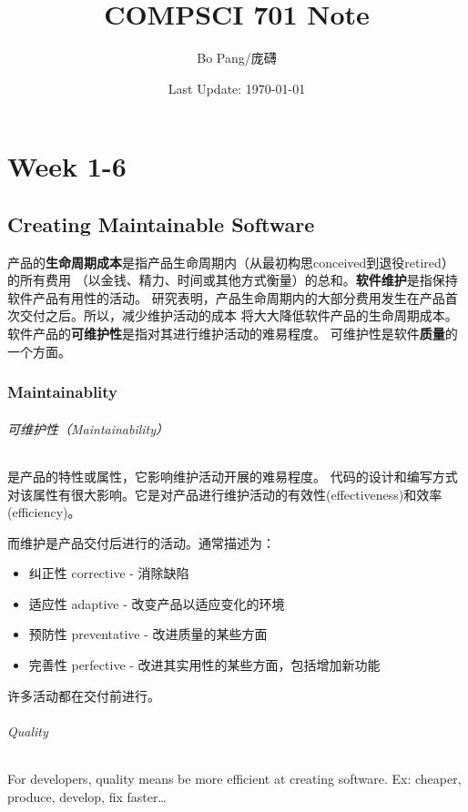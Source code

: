 \documentclass[]{ctexbook}
\title{COMPSCI 701 Note}
\author{Bo Pang/庞礴}
\date{Last Update: \today}
\begin{document}
\maketitle
\tableofcontents

\part{Week 1-6}
\chapter{Creating Maintainable Software}

产品的\textbf{生命周期成本}是指产品生命周期内（从最初构思conceived到退役retired）的所有费用
（以金钱、精力、时间或其他方式衡量）的总和。\textbf{软件维护}是指保持软件产品有用性的活动。
研究表明，产品生命周期内的大部分费用发生在产品首次交付之后。所以，减少维护活动的成本
将大大降低软件产品的生命周期成本。软件产品的\textbf{可维护性}是指对其进行维护活动的难易程度。
可维护性是软件\textbf{质量}的一个方面。

\section{Maintainablity}
\paragraph{可维护性（Maintainability）}是产品的特性或属性，它影响维护活动开展的难易程度。
代码的设计和编写方式对该属性有很大影响。它是对产品进行维护活动的有效性(effectiveness)和效率(efficiency)。

而维护是产品交付后进行的活动。通常描述为：
\begin{itemize}
    \item 纠正性 corrective - 消除缺陷
    \item 适应性 adaptive - 改变产品以适应变化的环境
    \item 预防性 preventative - 改进质量的某些方面
    \item 完善性 perfective - 改进其实用性的某些方面，包括增加新功能
\end{itemize}

许多活动都在交付前进行。

\paragraph{Quality} For developers, quality means be more efficient at creating software. Ex: cheaper, produce, develop, fix faster\dots
\end{document}
